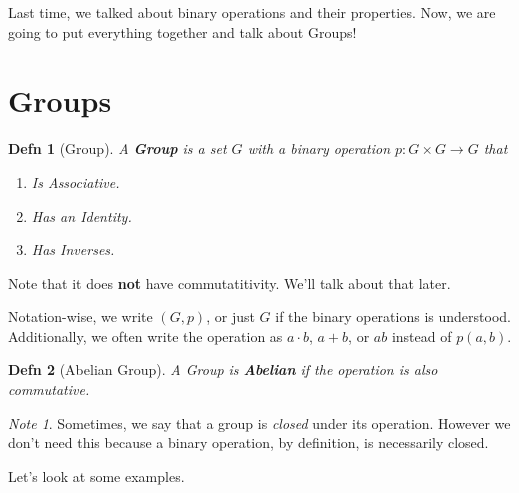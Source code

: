 \documentclass[12pt]{article}
\newtheorem{definition}{Defn}
\theoremstyle{remark}
\theoremstyle{remark}
\theoremstyle{remark}
\theoremstyle{remark}
\theoremstyle{remark}
\newtheorem*{note}{Note}
\begin{document}
Last time, we talked about binary operations and their properties. Now, we are
going to put everything together and talk about Groups!

\section{Groups}

\begin{definition}[Group]
	A {\bf Group} is a set $G$ with a binary operation $p: G \times G \to G$
	that

	\begin{enumerate}
		\item Is {\it Associative}.
		\item Has an {\it Identity}.
		\item Has {\it Inverses}.
	\end{enumerate}
\end{definition}

Note that it does {\bf not} have commutatitivity. We'll talk about that
later.

Notation-wise, we write $(G, p)$, or just $G$ if the binary operations is
understood. Additionally, we often write the operation as $a \cdot b$, $a + b$,
or $ab$ instead of $p(a, b)$.

\begin{definition}[Abelian Group]
	A Group is {\bf Abelian} if the operation is also {\it commutative}.
\end{definition}

\begin{note}
	Sometimes, we say that a group is {\it closed} under its operation. However
	we don't need this because a binary operation, by definition, is necessarily
	closed.
\end{note}

Let's look at some examples.
\end{document}
